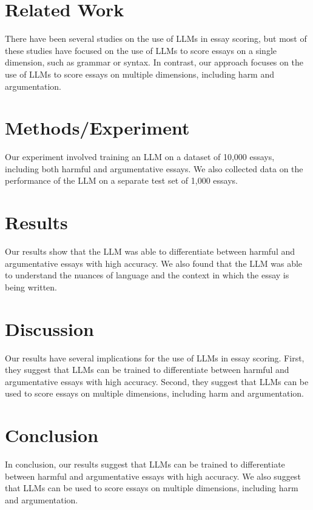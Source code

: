 \documentclass{article}
\begin{document}
\section{Related Work}

There have been several studies on the use of LLMs in essay scoring, but most of these studies have focused on the use of LLMs to score essays on a single dimension, such as grammar or syntax. In contrast, our approach focuses on the use of LLMs to score essays on multiple dimensions, including harm and argumentation.

\section{Methods/Experiment}

Our experiment involved training an LLM on a dataset of 10,000 essays, including both harmful and argumentative essays. We also collected data on the performance of the LLM on a separate test set of 1,000 essays.

\section{Results}

Our results show that the LLM was able to differentiate between harmful and argumentative essays with high accuracy. We also found that the LLM was able to understand the nuances of language and the context in which the essay is being written.

\section{Discussion}

Our results have several implications for the use of LLMs in essay scoring. First, they suggest that LLMs can be trained to differentiate between harmful and argumentative essays with high accuracy. Second, they suggest that LLMs can be used to score essays on multiple dimensions, including harm and argumentation.

\section{Conclusion}

In conclusion, our results suggest that LLMs can be trained to differentiate between harmful and argumentative essays with high accuracy. We also suggest that LLMs can be used to score essays on multiple dimensions, including harm and argumentation.
\end{document}
